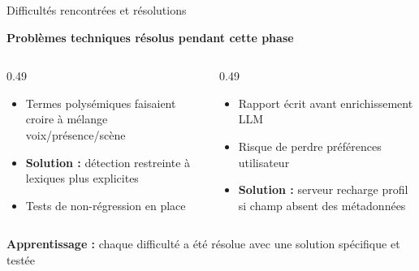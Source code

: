 \documentclass[10pt,aspectratio=169]{beamer}
\begin{document}
\begin{frame}{Difficultés rencontrées et résolutions}
\begin{keybox}
\textbf{Problèmes techniques résolus pendant cette phase}
\end{keybox}
\vspace{0.35cm}
\begin{columns}[T]
\begin{column}{0.49\textwidth}
\begin{tcolorbox}[title=Faux "multi-axes", colframe=danger, colback=danger!3]
\small
\begin{itemize}
    \item Termes polysémiques faisaient croire à mélange voix/présence/scène
    \item \textbf{Solution :} détection restreinte à lexiques plus explicites
    \item Tests de non-régression en place
\end{itemize}
\end{tcolorbox}
\end{column}
\begin{column}{0.49\textwidth}
\begin{tcolorbox}[title=Cohérence profil--rapport, colframe=warning!60!black, colback=warning!8]
\small
\begin{itemize}
    \item Rapport écrit avant enrichissement LLM
    \item Risque de perdre préférences utilisateur
    \item \textbf{Solution :} serveur recharge profil si champ absent des métadonnées
\end{itemize}
\end{tcolorbox}
\end{column}
\end{columns}
\vspace{0.3cm}
\begin{tcolorbox}[colback=secondary!45,colframe=primary!25]
\small \textbf{Apprentissage :} chaque difficulté a été résolue avec une solution spécifique et testée
\end{tcolorbox}
\end{frame}
\end{document}
